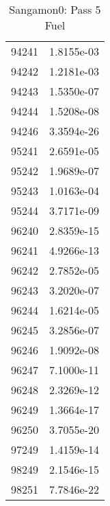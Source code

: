 \begin{table}[h!]
\begin{tabular}{|| c || c |}
94241 & 1.8155e-03 \\
94242 & 1.2181e-03 \\
94243 & 1.5350e-07 \\
94244 & 1.5208e-08 \\
94246 & 3.3594e-26 \\
95241 & 2.6591e-05 \\
95242 & 1.9689e-07 \\
95243 & 1.0163e-04 \\
95244 & 3.7171e-09 \\
96240 & 2.8359e-15 \\
96241 & 4.9266e-13 \\
96242 & 2.7852e-05 \\
96243 & 3.2020e-07 \\
96244 & 1.6214e-05 \\
96245 & 3.2856e-07 \\
96246 & 1.9092e-08 \\
96247 & 7.1000e-11 \\
96248 & 2.3269e-12 \\
96249 & 1.3664e-17 \\
96250 & 3.7055e-20 \\
97249 & 1.4159e-14 \\
98249 & 2.1546e-15 \\
98251 & 7.7846e-22 \\

\hline
\end{tabular}
\caption{Sangamon0: Pass 5 Fuel}
\label{table:sang0p5fuel}
\end{table}